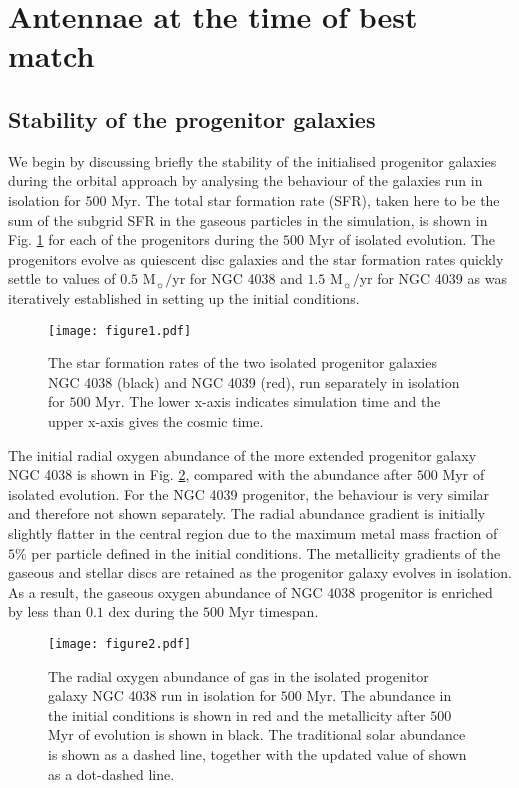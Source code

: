 \documentclass[a4paper,fleqn,usenatbib]{mnras}
\begin{document}
\section{Antennae at the time of best match}

\subsection{Stability of the progenitor galaxies}\label{section:ic_stability}



We begin by discussing briefly the stability of the initialised progenitor galaxies 
during the orbital approach by analysing the behaviour of the galaxies run in 
isolation for $500$ Myr. 
The total star formation rate (SFR), taken here to be the sum of the subgrid SFR in the
gaseous particles in the simulation, is shown in Fig. \ref{fig:ic_sfr} for each of the progenitors during the $500$ Myr of 
isolated evolution. The progenitors evolve 
as quiescent disc galaxies and the star formation rates quickly settle to 
values of $0.5$ M$_{\sun}/$yr 
for NGC 4038 and $1.5$ M$_{\sun}/$yr for NGC 4039 as was iteratively 
established in setting up the initial conditions. 

\begin{figure}
\texttt{[image: figure1.pdf]}
\caption{The star formation rates of the two isolated progenitor galaxies NGC 4038 (black) and NGC 4039 (red), run separately in isolation for $500$ Myr.
The lower x-axis indicates simulation time and the upper x-axis gives the 
cosmic time.}
\label{fig:ic_sfr}
\end{figure}


The initial radial oxygen abundance of the more 
extended progenitor galaxy NGC 4038 is shown in Fig. \ref{fig:ic_metals}, 
compared with the abundance after 
$500$ Myr of isolated evolution. 
For the NGC 4039 progenitor, the behaviour is very similar and therefore not shown separately.
The radial abundance gradient is initially slightly flatter in the central region due to the maximum metal  
mass fraction of $5\%$ per particle defined in the initial conditions. 
The metallicity gradients of the gaseous and stellar 
discs are retained as the progenitor galaxy evolves in isolation. As a result, the gaseous oxygen abundance of NGC 4038 progenitor 
is enriched by less than $0.1$ dex during the $500$ Myr timespan.

\begin{figure}
\texttt{[image: figure2.pdf]}
\caption{The radial oxygen abundance of gas in the isolated progenitor galaxy NGC 4038 run 
in isolation for $500$ Myr. The abundance in the initial conditions is shown in red and
the metallicity after $500$ Myr of evolution is shown in black. The traditional solar abundance
\citep{1984MNRAS.211..507E} is shown as a dashed line, together with the updated value of 
\citet{2009ARA&A..47..481A} shown as a dot-dashed line.}
\label{fig:ic_metals}
\end{figure}
\end{document}
